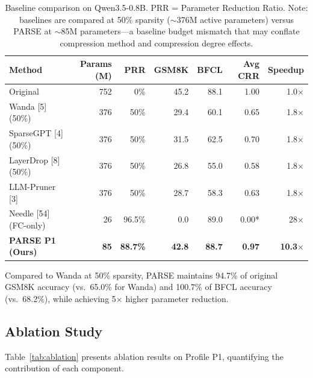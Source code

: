 \documentclass[twocolumn]{article}
\begin{document}
\begin{table}[t]
\caption{Baseline comparison on Qwen3.5-0.8B. PRR = Parameter Reduction Ratio. Note: baselines are compared at 50\% sparsity ($\sim$376M active parameters) versus PARSE at $\sim$85M parameters---a baseline budget mismatch that may conflate compression method and compression degree effects.}
\label{tab:baseline}
\centering
\small
\begin{tabular}{l|r|r|rr|r|r}
\toprule
Method & Params (M) & PRR & GSM8K & BFCL & Avg CRR & Speedup \\
\midrule
Original & 752 & 0\% & 45.2 & 88.1 & 1.00 & 1.0$\times$ \\
Wanda [5] (50\%) & 376 & 50\% & 29.4 & 60.1 & 0.65 & 1.8$\times$ \\
SparseGPT [4] (50\%) & 376 & 50\% & 31.5 & 62.5 & 0.70 & 1.8$\times$ \\
LayerDrop [8] (50\%) & 376 & 50\% & 26.8 & 55.0 & 0.58 & 1.8$\times$ \\
LLM-Pruner [3] & 376 & 50\% & 28.7 & 58.3 & 0.63 & 1.8$\times$ \\
Needle [54] (FC-only) & 26 & 96.5\% & 0.0 & 89.0 & 0.00* & 28$\times$ \\
\textbf{PARSE P1 (Ours)} & \textbf{85} & \textbf{88.7\%} & \textbf{42.8} & \textbf{88.7} & \textbf{0.97} & \textbf{10.3$\times$} \\
\bottomrule
\end{tabular}
\end{table}

Compared to Wanda at 50\% sparsity, PARSE maintains 94.7\% of original GSM8K accuracy (vs.\ 65.0\% for Wanda) and 100.7\% of BFCL accuracy (vs.\ 68.2\%), while achieving 5$\times$ higher parameter reduction.

\subsection{Ablation Study}

Table~\ref{tab:ablation} presents ablation results on Profile P1, quantifying the contribution of each component.
\end{document}
